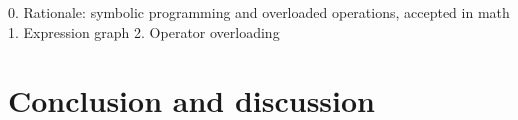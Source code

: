 \documentclass[conference]{IEEEtran}
\begin{document}
0. Rationale: symbolic programming and overloaded operations, accepted in math
1. Expression graph
2. Operator overloading

\newpage

\section{Conclusion and discussion}





 




\end{document}
